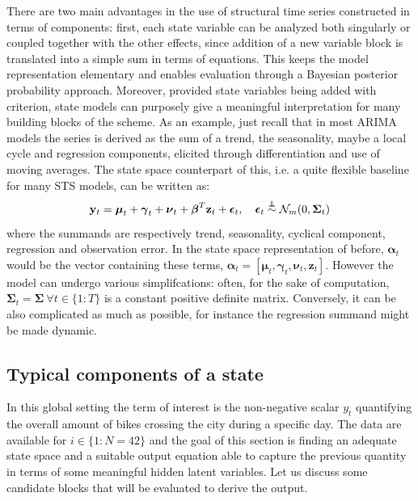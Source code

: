\documentclass[11pt,twoside]{report}
\newcommand\independent{\protect\mathpalette{\protect\independenT}{\perp}}
\def\independenT#1#2{\mathrel{\rlap{$#1#2$}\mkern2mu{#1#2}}}
\begin{document}
There are two main advantages in the use of structural time series constructed in terms of components: first, each state variable can be analyzed both singularly or coupled together with the other effects, since addition of a new variable block is translated into a simple sum in terms of equations. This keeps the model representation elementary and enables evaluation through a Bayesian posterior probability approach. Moreover, provided state variables being added with criterion, state models can purposely give a meaningful interpretation for many building blocks of the scheme. As an example, just recall that in most ARIMA models the series is derived as the sum of a trend, the seasonality, maybe a local cycle and regression components, elicited through differentiation and use of moving averages. The state space counterpart of this, i.e. a quite flexible baseline for many STS models, can be written as:
\begin{equation}
\mathbf{y}_t = \boldsymbol{\mu}_t + \boldsymbol{\gamma}_t + \boldsymbol{\nu}_t + \boldsymbol{\beta}^T \mathbf{z}_t + \boldsymbol{\epsilon}_t
,\quad \boldsymbol{\epsilon}_t\overset{\independent}{\sim} \mathcal{N}_m(0, \boldsymbol{\Sigma}_t)
\end{equation}
where the summands are respectively trend, seasonality, cyclical component, regression and observation error. In the state space representation of before, $ \boldsymbol{\alpha}_t $ would be the vector containing these terms, $ \boldsymbol{\alpha}_t = [\boldsymbol{\mu}_t, \boldsymbol{\gamma}_t, \boldsymbol{\nu}_t, \mathbf{z}_t] $. However the model can undergo various simplifcations: often, for the sake of computation, $ \boldsymbol{\Sigma}_t=\boldsymbol{\Sigma}\ \forall t \in \{1:T\} $ is a constant positive definite matrix. Conversely, it can be also complicated as much as possible, for instance the regression summand might be made dynamic.

\subsection{Typical components of a state}
In this global setting the term of interest is the non-negative scalar $ y_t $ quantifying the overall amount of bikes crossing the city during a specific day. The data are available for $ i\in\{1:N=42\}$ and the goal of this section is finding an adequate state space and a suitable output equation able to capture the previous quantity in terms of some meaningful hidden latent variables. Let us discuss some candidate blocks that will be evaluated to derive the output.
\end{document}
